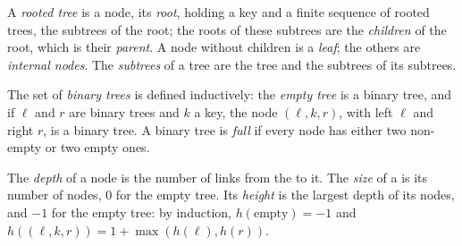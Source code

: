 \begin{definition}\label{def:b1:induction-and-termination:rooted-tree}
A \emph{rooted tree} is a node, its \emph{root}, holding a key and a finite
sequence of rooted trees, the subtrees of the root; the roots of these subtrees are the \emph{children} of the root, which is their \emph{parent}. A node without children is a \emph{leaf};
the others are \emph{internal nodes}. The \emph{subtrees} of a tree are the tree
and the subtrees of its subtrees.
\end{definition}

\begin{definition}\label{def:b1:induction-and-termination:binary-tree}
The set of \emph{binary trees} is defined inductively: the \emph{empty tree} is a binary tree, and if
$\ell$ and $r$ are binary trees and $k$ a key, the node $(\ell, k, r)$, with left  $\ell$ and right  $r$,
is a binary tree. A binary tree is \emph{full} if every node has either two non-empty 
or two empty ones.
\end{definition}

\begin{definition}\label{def:b1:induction-and-termination:height}
The \emph{depth} of a node is the number of links from the  to it. The
\emph{size} of a  is its number of nodes, 0 for the empty tree. Its
\emph{height} is the largest depth of its nodes, and $-1$ for the empty tree: by induction,
$h(\text{empty}) = -1$ and $h((\ell, k, r)) = 1 + \max(h(\ell), h(r))$.
\end{definition}

\label{lst:b1:induction-and-termination:inductive}

